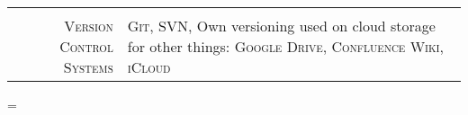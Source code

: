 \documentclass[a4paper,10pt,notitlepage]{article}
\newenvironment{absolutelynopagebreak}
  {\par\nobreak\vfil\penalty0\vfilneg
   \vtop\bgroup}
  {\par\xdef\tpd{\the\prevdepth}\egroup
   \prevdepth=\tpd}
\begin{document}
\begin{absolutelynopagebreak}
\begin{tabular}{r|p{11cm}}
		\multicolumn{2}{c}{} \\
		 
		\textsc{Version Control Systems}  & \textsc{Git}, \textsc{SVN}, Own versioning used on cloud storage for other things: \textsc{Google Drive}, \textsc{Confluence Wiki}, \textsc{iCloud} \\    
		 
	\end{tabular}
	
\end{absolutelynopagebreak}
	
	
\end{document}
